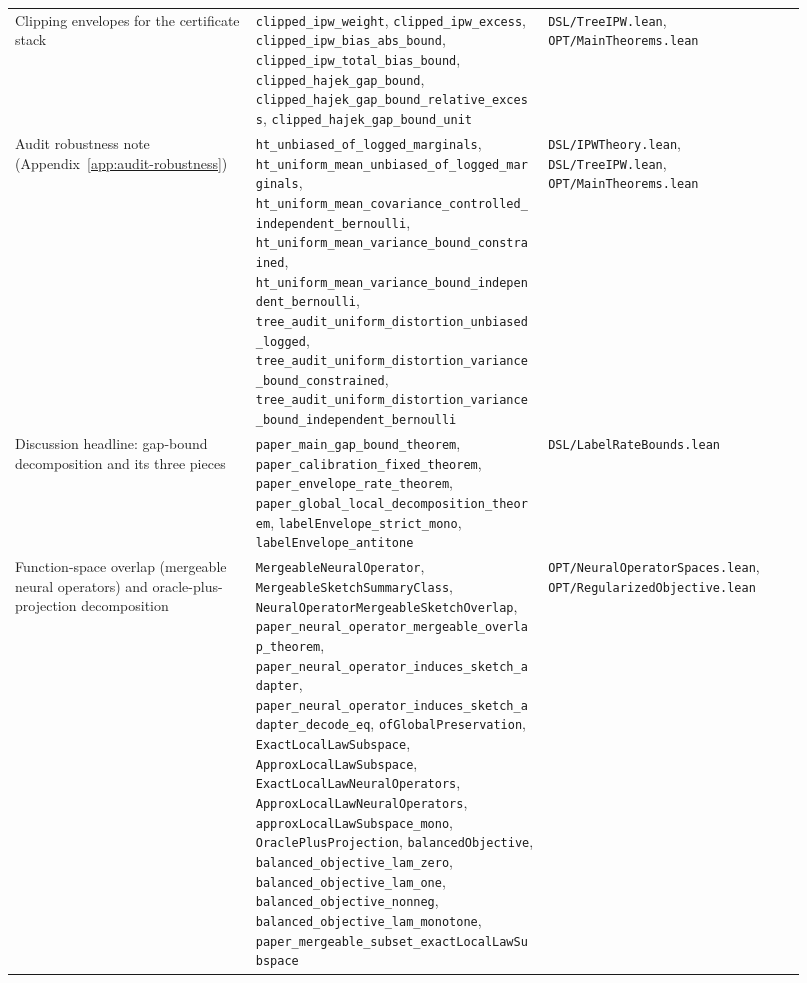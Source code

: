 \begin{table}[h]
\begin{tabular}{p{0.28\linewidth}p{0.34\linewidth}p{0.30\linewidth}}
Clipping envelopes for the certificate stack &
\texttt{clipped\_ipw\_weight}, \texttt{clipped\_ipw\_excess}, \texttt{clipped\_ipw\_bias\_abs\_bound}, \texttt{clipped\_ipw\_total\_bias\_bound}, \texttt{clipped\_hajek\_gap\_bound}, \texttt{clipped\_hajek\_gap\_bound\_relative\_excess}, \texttt{clipped\_hajek\_gap\_bound\_unit} &
\texttt{DSL/TreeIPW.lean}, \texttt{OPT/MainTheorems.lean} \\

Audit robustness note (Appendix~\ref{app:audit-robustness}) &
\texttt{ht\_unbiased\_of\_logged\_marginals}, \texttt{ht\_uniform\_mean\_unbiased\_of\_logged\_marginals}, \texttt{ht\_uniform\_mean\_covariance\_controlled\_independent\_bernoulli}, \texttt{ht\_uniform\_mean\_variance\_bound\_constrained}, \texttt{ht\_uniform\_mean\_variance\_bound\_independent\_bernoulli}, \texttt{tree\_audit\_uniform\_distortion\_unbiased\_logged}, \texttt{tree\_audit\_uniform\_distortion\_variance\_bound\_constrained}, \texttt{tree\_audit\_uniform\_distortion\_variance\_bound\_independent\_bernoulli} &
\texttt{DSL/IPWTheory.lean}, \texttt{DSL/TreeIPW.lean}, \texttt{OPT/MainTheorems.lean} \\

Discussion headline: gap-bound decomposition and its three pieces &
\texttt{paper\_main\_gap\_bound\_theorem}, \texttt{paper\_calibration\_fixed\_theorem}, \texttt{paper\_envelope\_rate\_theorem}, \texttt{paper\_global\_local\_decomposition\_theorem}, \texttt{labelEnvelope\_strict\_mono}, \texttt{labelEnvelope\_antitone} &
\texttt{DSL/LabelRateBounds.lean} \\

Function-space overlap (mergeable neural operators) and oracle-plus-projection decomposition &
\texttt{MergeableNeuralOperator}, \texttt{MergeableSketchSummaryClass}, \texttt{NeuralOperatorMergeableSketchOverlap}, \texttt{paper\_neural\_operator\_mergeable\_overlap\_theorem}, \texttt{paper\_neural\_operator\_induces\_sketch\_adapter}, \texttt{paper\_neural\_operator\_induces\_sketch\_adapter\_decode\_eq}, \texttt{ofGlobalPreservation}, \texttt{ExactLocalLawSubspace}, \texttt{ApproxLocalLawSubspace}, \texttt{ExactLocalLawNeuralOperators}, \texttt{ApproxLocalLawNeuralOperators}, \texttt{approxLocalLawSubspace\_mono}, \texttt{OraclePlusProjection}, \texttt{balancedObjective}, \texttt{balanced\_objective\_lam\_zero}, \texttt{balanced\_objective\_lam\_one}, \texttt{balanced\_objective\_nonneg}, \texttt{balanced\_objective\_lam\_monotone}, \texttt{paper\_mergeable\_subset\_exactLocalLawSubspace} &
\texttt{OPT/NeuralOperatorSpaces.lean}, \texttt{OPT/RegularizedObjective.lean} \\


\end{tabular}
\end{table}
